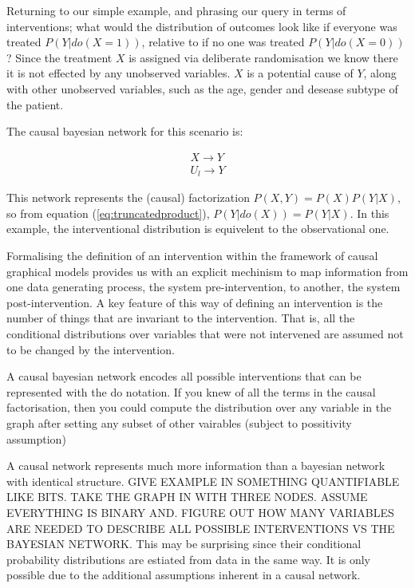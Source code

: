 \documentclass[11pt,a4paper,oneside]{book}
\newcommand{\eq}[1]{\begin{align*}#1\end{align*}}
\begin{document}
Returning to our simple example, and phrasing our query in terms of interventions; what would the distribution of outcomes look like if everyone was treated $P(Y|do(X=1))$, relative to if no one was treated $P(Y|do(X=0))$? Since the treatment $X$ is assigned  via deliberate randomisation we know there it is not effected by any unobserved variables. $X$ is a potential cause of $Y$, along with other unobserved variables, such as the age, gender and desease subtype of the patient. 

The causal bayesian network for this scenario is:

\eq{
X \rightarrow Y\\
U_l \rightarrow Y
}

This network represents the (causal) factorization  $P(X,Y) = P(X)P(Y|X)$, so from equation (\ref{eq:truncatedproduct}), $P(Y|do(X)) = P(Y|X)$. In this example, the interventional distribution is equivelent to the observational one.

Formalising the definition of an intervention within the framework of causal graphical models provides us with an explicit mechinism to map information from one data generating process, the system pre-intervention, to another, the system post-intervention. A key feature of this way of defining an intervention is the number of things that are invariant to the intervention. That is, all the conditional distributions over variables that were not intervened are assumed not to be changed by the intervention.



A causal bayesian network encodes all possible interventions that can be represented with the do notation. If you knew of all the terms in the causal factorisation, then you could compute the distribution over any variable in the graph after setting any subset of other vairables (subject to possitivity assumption) 


A causal network represents much more information than a bayesian network with identical structure. GIVE EXAMPLE IN SOMETHING QUANTIFIABLE LIKE BITS. TAKE THE GRAPH IN WITH THREE NODES. ASSUME EVERYTHING IS BINARY AND. FIGURE OUT HOW MANY VARIABLES ARE NEEDED TO DESCRIBE ALL POSSIBLE INTERVENTIONS VS THE BAYESIAN NETWORK. This may be surprising since their conditional probability distributions are estiated from data in the same way. It is only possible due to the additional assumptions inherent in a causal network. 
\end{document}
